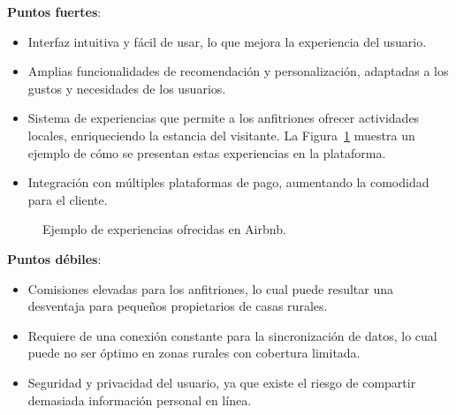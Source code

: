 \textbf{Puntos fuertes}:
\begin{itemize}
    \item Interfaz intuitiva y fácil de usar, lo que mejora la experiencia del usuario.
    \item Amplias funcionalidades de recomendación y personalización, adaptadas a los gustos y necesidades de los usuarios.
    \item Sistema de experiencias que permite a los anfitriones ofrecer actividades locales, enriqueciendo la estancia del visitante. La Figura~\ref{fig:airbnb-experiencias} muestra un ejemplo de cómo se presentan estas experiencias en la plataforma.
    \item Integración con múltiples plataformas de pago, aumentando la comodidad para el cliente.
\end{itemize}
\begin{figure}[h!tb]
    \centering
    \setlength{\fboxsep}{15pt}%
    \setlength{\fboxrule}{0.5pt}%
    \caption{Ejemplo de experiencias ofrecidas en Airbnb.}
    \label{fig:airbnb-experiencias}
\end{figure}

\textbf{Puntos débiles}:
\begin{itemize}
    \item Comisiones elevadas para los anfitriones, lo cual puede resultar una desventaja para pequeños propietarios de casas rurales.
    \item Requiere de una conexión constante para la sincronización de datos, lo cual puede no ser óptimo en zonas rurales con cobertura limitada.
    \item Seguridad y privacidad del usuario, ya que existe el riesgo de compartir demasiada información personal en línea.
\end{itemize}

